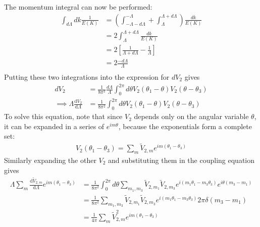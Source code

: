 \documentclass[14pt]{extarticle}
\begin{document}
The momentum integral can now be performed:
\begin{equation}\begin{aligned}
	\int_{d\Lambda} dk \frac{1}{E(K)} &= \left(\int_{-\Lambda-d\Lambda}^{-\Lambda} + \int_{\Lambda}^{\Lambda+d\Lambda}\right)\frac{dk}{E(K)}\\
				&= 2\int_{\Lambda}^{\Lambda+d\Lambda}\frac{dk}{E(K)}\\
				&=2\left[\frac{1}{\Lambda + d\Lambda} - \frac{1}{\Lambda}\right]\\
				&=2\frac{-d\Lambda}{\Lambda}\\
\end{aligned}\end{equation}
Putting these two integrations into the expression for \(dV_2\) gives
\begin{equation}\begin{aligned}
dV_2 &= \frac{1}{8\pi^2}\frac{d\Lambda}{\Lambda}\int_0^{2\pi} d\theta V_2(\theta_1 - \theta)V_2(\theta - \theta_3)\\
\implies \Lambda\frac{\mathrm{d}V_2}{\mathrm{d}\Lambda} &= \frac{1}{8\pi^2}\int_0^{2\pi} d\theta V_2(\theta_1 - \theta)V_2(\theta - \theta_3)
\end{aligned}\end{equation}
To solve this equation, note that since \(V_2\) depends only on the angular variable \(\theta\), it can be expanded in a series of \(e^{im\theta}\), because the exponentials form a complete set:
\begin{equation}\begin{aligned}
	V_2(\theta_1 - \theta_3) = \sum_m \tilde V_{2,m} e^{im\left(\theta_1 - \theta_3\right)}
\end{aligned}\end{equation}
Similarly expanding the other \(V_2\) and substituting them in the coupling equation gives
\begin{equation}\begin{aligned}
	\Lambda \sum_m \frac{\mathrm{d}\tilde V_{2,m}}{\mathrm{d}\Lambda} e^{im\left(\theta_1 - \theta_3\right)} &= \frac{1}{8\pi^2}\int_0^{2\pi} d\theta \sum_{m_1,m_3}\tilde V_{2,m_1}\tilde V_{2,m_3}e^{i\left(m_1\theta_1 - m_3\theta_3\right)}e^{i\theta\left(m_3 - m_1\right)}\\
											   &=\frac{1}{8\pi^2}\sum_{m_1,m_3}\tilde V_{2,m_1}\tilde V_{2,m_3}e^{i\left(m_1\theta_1 - m_3\theta_3\right)}2\pi \delta\left(m_3 - m_1\right)\\
											   &=\frac{1}{4\pi}\sum_{m}\tilde V_{2,m}^2e^{im\left(\theta_1 - \theta_3\right)}\\
\end{aligned}\end{equation}
\end{document}
